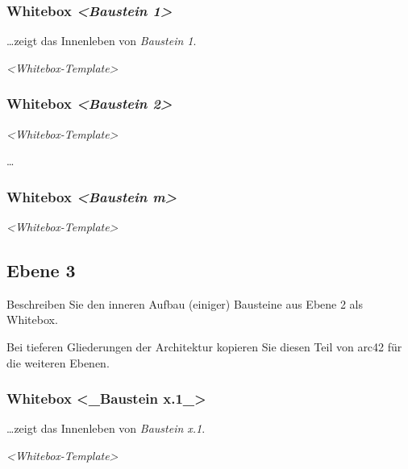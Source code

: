 \documentclass[a4paper,12pt]{article}
\begin{document}
\subsubsection{\texorpdfstring{Whitebox \emph{\textless Baustein
1\textgreater{}}}{Whitebox \textless Baustein 1\textgreater{}}}\label{_whitebox_baustein_1}

\ldots\hspace{0pt}zeigt das Innenleben von \emph{Baustein 1}.

\emph{\textless Whitebox-Template\textgreater{}}

\subsubsection{\texorpdfstring{Whitebox \emph{\textless Baustein
2\textgreater{}}}{Whitebox \textless Baustein 2\textgreater{}}}\label{_whitebox_baustein_2}

\emph{\textless Whitebox-Template\textgreater{}}

\ldots\hspace{0pt}

\subsubsection{\texorpdfstring{Whitebox \emph{\textless Baustein
m\textgreater{}}}{Whitebox \textless Baustein m\textgreater{}}}\label{_whitebox_baustein_m}

\emph{\textless Whitebox-Template\textgreater{}}

\subsection{Ebene 3}\label{_ebene_3}

Beschreiben Sie den inneren Aufbau (einiger) Bausteine aus Ebene 2 als
Whitebox.

Bei tieferen Gliederungen der Architektur kopieren Sie diesen Teil von
arc42 für die weiteren Ebenen.

\subsubsection{Whitebox \textless\_Baustein
x.1\_\textgreater{}}\label{_whitebox_baustein_x_1}

\ldots\hspace{0pt}zeigt das Innenleben von \emph{Baustein x.1}.

\emph{\textless Whitebox-Template\textgreater{}}
\end{document}
